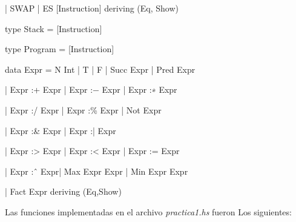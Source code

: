 \documentclass[12pt, letterpaper]{article}
\begin{document}
  \hspace{4cm}                  | SWAP | ES [Instruction] deriving (Eq, Show) \vspace{.2cm}


  \hspace{.5cm} type Stack = [Instruction]\vspace{.2cm}

  \hspace{.5cm} type Program = [Instruction]\vspace{.2cm}

  \hspace{.5cm} data Expr = N Int | T | F | Succ Expr | Pred Expr \vspace{.1cm}

  \hspace{4cm}             | Expr :+ Expr | Expr :− Expr | Expr :∗ Expr \vspace{.1cm}

  \hspace{4cm}             | Expr :/ Expr | Expr :\% Expr | Not Expr  \vspace{.1cm}

  \hspace{4cm}             | Expr :& Expr | Expr :| Expr \vspace{.1cm}

  \hspace{4cm}             | Expr :> Expr | Expr :< Expr | Expr := Expr \vspace{.1cm}

  \hspace{4cm}             | Expr :ˆ Expr| Max Expr Expr | Min Expr Expr \vspace{.1cm}

  \hspace{4cm}             | Fact Expr deriving (Eq,Show) \vspace{.3cm}

  Las funciones implementadas en el archivo \textit{practica1.hs} fueron Los
  siguientes:\vspace{.3cm}
\end{document}
